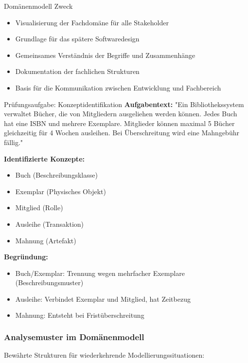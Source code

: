 \begin{theorem}{Domänenmodell Zweck}
\begin{itemize}
    \item Visualisierung der Fachdomäne für alle Stakeholder
    \item Grundlage für das spätere Softwaredesign
    \item Gemeinsames Verständnis der Begriffe und Zusammenhänge
    \item Dokumentation der fachlichen Strukturen
    \item Basis für die Kommunikation zwischen Entwicklung und Fachbereich
\end{itemize}
\end{theorem}

\begin{example2}{Prüfungsaufgabe: Konzeptidentifikation}
\textbf{Aufgabentext:} 
"Ein Bibliothekssystem verwaltet Bücher, die von Mitgliedern ausgeliehen werden können. Jedes Buch hat eine ISBN und mehrere Exemplare. Mitglieder können maximal 5 Bücher gleichzeitig für 4 Wochen ausleihen. Bei Überschreitung wird eine Mahngebühr fällig."

\textbf{Identifizierte Konzepte:}
\begin{itemize}
    \item Buch (Beschreibungsklasse)
    \item Exemplar (Physisches Objekt)
    \item Mitglied (Rolle)
    \item Ausleihe (Transaktion)
    \item Mahnung (Artefakt)
\end{itemize}

\textbf{Begründung:}
\begin{itemize}
    \item Buch/Exemplar: Trennung wegen mehrfacher Exemplare (Beschreibungsmuster)
    \item Ausleihe: Verbindet Exemplar und Mitglied, hat Zeitbezug
    \item Mahnung: Entsteht bei Fristüberschreitung
\end{itemize}
\end{example2}

\subsubsection{Analysemuster im Domänenmodell}
Bewährte Strukturen für wiederkehrende Modellierungssituationen:

